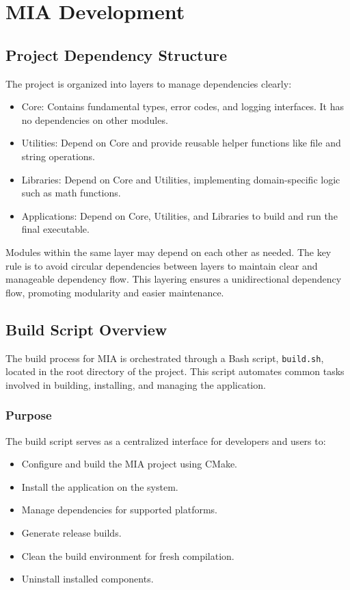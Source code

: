 \chapter{MIA Development}
\pagestyle{fancy}






\section{Project Dependency Structure}
\label{sec:dependancy-structure}

The project is organized into layers to manage dependencies clearly:
\begin{itemize}
\item Core: Contains fundamental types, error codes, and logging interfaces. It has no dependencies on other modules.
\item Utilities: Depend on Core and provide reusable helper functions like file and string operations.
\item Libraries: Depend on Core and Utilities, implementing domain-specific logic such as math functions.
\item Applications: Depend on Core, Utilities, and Libraries to build and run the final executable.
\end{itemize}
Modules within the same layer may depend on each other as needed. The key rule is to avoid circular dependencies between layers to maintain clear and manageable dependency flow. This layering ensures a unidirectional dependency flow, promoting modularity and easier maintenance.






\section{Build Script Overview}
\label{sec:build-script}

The build process for MIA is orchestrated through a Bash script, \texttt{build.sh}, located in the root directory of the project. This script automates common tasks involved in building, installing, and managing the application.

\subsection{Purpose}

The build script serves as a centralized interface for developers and users to:
\begin{itemize}
	\item Configure and build the MIA project using CMake.
	\item Install the application on the system.
	\item Manage dependencies for supported platforms.
	\item Generate release builds.
	\item Clean the build environment for fresh compilation.
	\item Uninstall installed components.
\end{itemize}

